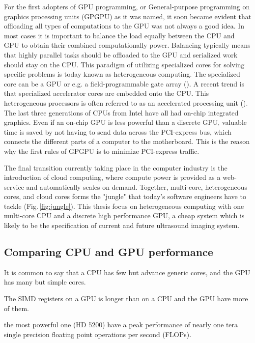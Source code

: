 For the first adopters of GPU programming, or General-purpose programming on graphics processing units (GPGPU) as it was named, it soon became evident that offloading all types of computations to the GPU was not always a good idea. In most cases it is important to balance the load equally between the CPU and GPU to obtain their combined computationally power. Balancing typically means that highly parallel tasks should be offloaded to the GPU and serialized work should stay on the CPU. This paradigm of utilizing specialized cores for solving specific problems is today known as heterogeneous computing. The specialized core can be a GPU or e.g. a field-programmable gate array (). A recent trend is that specialized accelerator cores are embedded onto the CPU. This heterogeneous processors is often referred to as an accelerated processing unit (). The last three generations of CPUs from Intel have all had on-chip integrated graphics. Even if an on-chip GPU is less powerful than a discrete GPU, valuable time is saved by not having to send data across the PCI-express bus, which connects the different parts of a computer to the motherboard. This is the reason why the first rules of GPGPU is to minimize PCI-express traffic. 

The final transition currently taking place in the computer industry is the introduction of cloud computing, where compute power is provided as a web-service and automatically scales on demand. Together, multi-core, heterogeneous cores, and cloud cores forms the "jungle" that today's software engineers have to tackle (Fig.\,\ref{fig:jungle}). This thesis focus on heterogeneous computing with one multi-core CPU and a discrete high performance GPU, a cheap system which is likely to be the specification of current and future ultrasound imaging system.

\subsection{Comparing CPU and GPU performance}\label{sec:cpu_vs_gpu}
It is common to say that a CPU has few but advance generic cores, and the GPU has many but simple cores.

The SIMD registers on a GPU is longer than on a CPU and the GPU have more of them.

 the most powerful one (HD 5200) have a peak performance of nearly one tera single precision floating point operations per second (FLOPs).

